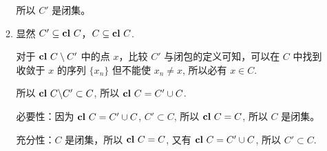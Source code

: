\documentclass[11pt,letter,notitlepage]{article}
\theoremstyle{definition}
\DeclareMathOperator*{\cl}{\bf cl\,}
\begin{document}
\begin{solution}
\begin{enumerate}
\begin{enumerate}
				所以 $C'$ 是闭集。

			      \item 显然 $C'\subseteq \cl C$，$C\subseteq \cl C$.

			            对于 $\cl C\setminus C'$ 中的点 $x$，比较 $C'$ 与闭包的定义可知，可以在 $C$ 中找到收敛于 $x$ 的序列 $\{x_n\}$ 但不能使 $x_n\neq x$, 所以必有 $x\in C$.

			            所以 $\cl C\backslash C'\subset C$, 所以 $\cl C=C'\cup C$.

			            必要性：因为 $\cl C=C'\cup C$, $C'\subset C$, 所以 $\cl C=C$, 所以 $C$ 是闭集。

			            充分性：$C$ 是闭集，所以 $\cl C=C$, 又有 $\cl C=C'\cup C$, 所以 $C'\subset C$.
		      \end{enumerate}
	\end{enumerate}
\end{solution}
\newpage
\end{document}
